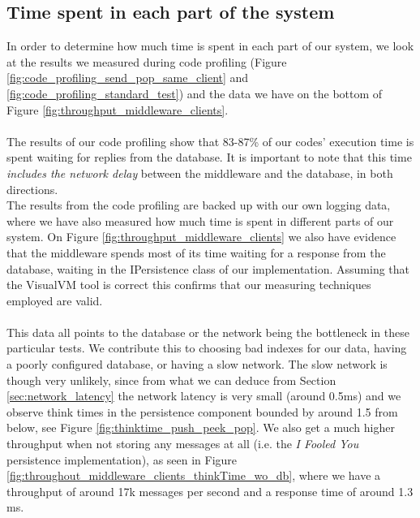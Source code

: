\documentclass{article}
\begin{document}
        \subsection{Time spent in each part of the system}
            \label{sec:time_spent_in_each_part_of_the_system}
            In order to determine how much time is spent in each part of our system, we look at the results we measured during code profiling (Figure \ref{fig:code_profiling_send_pop_same_client} and \ref{fig:code_profiling_standard_test}) and the data we have on the bottom of Figure \ref{fig:throughput_middleware_clients}.\\
            \\
            The results of our code profiling show that 83-87\% of our codes' execution time is spent waiting for replies from the database. It is important to note that this time \textit{includes the network delay} between the middleware and the database, in both directions.\\
            The results from the code profiling are backed up with our own logging data, where we have also measured how much time is spent in different parts of our system. On Figure \ref{fig:throughput_middleware_clients} we also have evidence that the middleware spends most of its time waiting for a response from the database, waiting in the IPersistence class of our implementation. Assuming that the VisualVM tool is correct this confirms that our measuring techniques employed are valid.\\
            \\
            This data all points to the database or the network being the bottleneck in these particular tests. We contribute this to choosing bad indexes for our data, having a poorly configured database, or having a slow network. The slow network is though very unlikely, since from what we can deduce from Section \ref{sec:network_latency} the network latency is very small (around 0.5ms) and we observe think times in the persistence component bounded by around 1.5 from below, see Figure \ref{fig:thinktime_push_peek_pop}. We also get a much higher throughput when not storing any messages at all (i.e. the \textit{I Fooled You} persistence implementation), as seen in Figure \ref{fig:throughout_middleware_clients_thinkTime_wo_db}, where we have a throughput of around 17k messages per second and a response time of around 1.3 ms.

\end{document}
